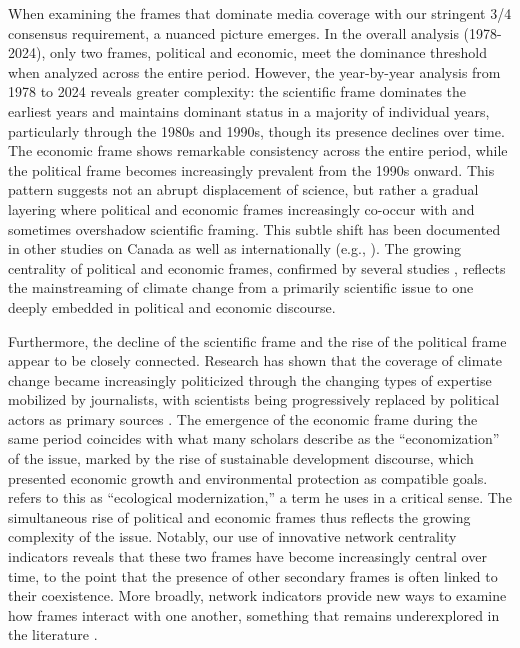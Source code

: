\documentclass[12pt]{article}
\begin{document}
When examining the frames that dominate media coverage with our stringent 3/4 consensus requirement, a nuanced picture emerges. In the overall analysis (1978-2024), only two frames, political and economic, meet the dominance threshold when analyzed across the entire period. However, the year-by-year analysis from 1978 to 2024 reveals greater complexity: the scientific frame dominates the earliest years and maintains dominant status in a majority of individual years, particularly through the 1980s and 1990s, though its presence declines over time. The economic frame shows remarkable consistency across the entire period, while the political frame becomes increasingly prevalent from the 1990s onward. This pattern suggests not an abrupt displacement of science, but rather a gradual layering where political and economic frames increasingly co-occur with and sometimes overshadow scientific framing. This subtle shift has been documented in other studies on Canada \autocite{einsiedelFramingScienceTechnology1992, einsiedelCanadienPressEnvironment1993, youngRepresentationsClimateChange2011} as well as internationally (e.g., \autocite{pulverCharacterizingClimateIssue2018}). The growing centrality of political and economic frames, confirmed by several studies \autocite{youngRepresentationsClimateChange2011, ahchongAnthropogenicClimateChange2012, stoddartCanadianNewsMedia2015, stoddartEndangeredArcticArctic2016}, reflects the mainstreaming of climate change from a primarily scientific issue to one deeply embedded in political and economic discourse.

Furthermore, the decline of the scientific frame and the rise of the political frame appear to be closely connected. Research has shown that the coverage of climate change became increasingly politicized through the changing types of expertise mobilized by journalists, with scientists being progressively replaced by political actors as primary sources \autocite{trumboConstructingClimateChange1996, chinnPoliticizationPolarizationClimate2020}. The emergence of the economic frame during the same period coincides with what many scholars describe as the ``economization'' of the issue, marked by the rise of sustainable development discourse, which presented economic growth and environmental protection as compatible goals. \textcite{hajerEcologicalModernisationCultural2009} refers to this as ``ecological modernization,'' a term he uses in a critical sense. The simultaneous rise of political and economic frames thus reflects the growing complexity of the issue. Notably, our use of innovative network centrality indicators reveals that these two frames have become increasingly central over time, to the point that the presence of other secondary frames is often linked to their coexistence. More broadly, network indicators provide new ways to examine how frames interact with one another, something that remains underexplored in the literature \autocite{snowFrameAlignmentProcesses1986}.
\end{document}
